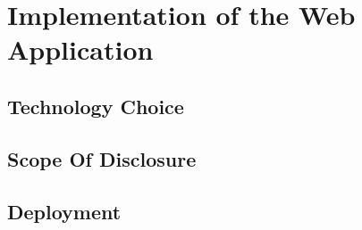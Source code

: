 \chapter{Implementation of the Web Application}

\section{Technology Choice}

\section{Scope Of Disclosure}

\section{Deployment}
